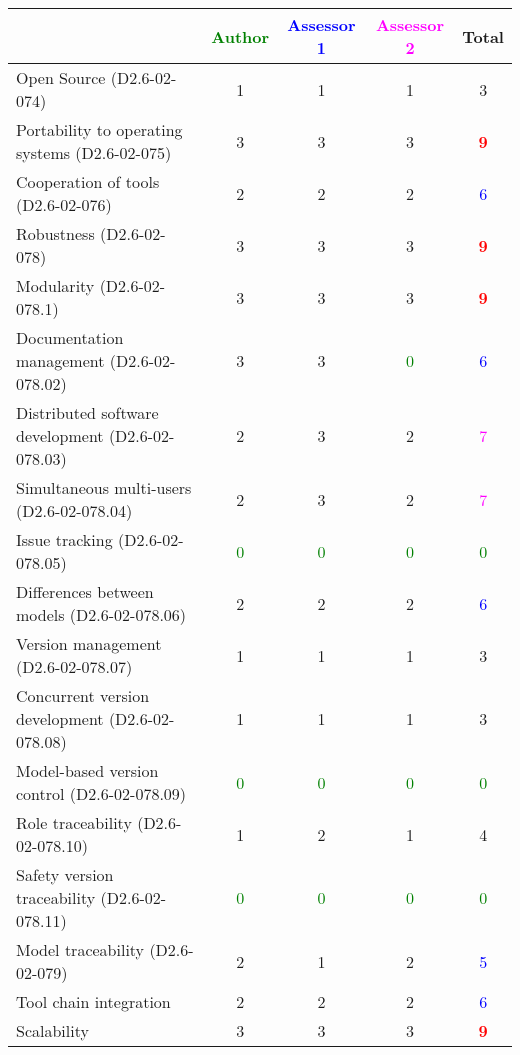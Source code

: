 \begin{tabular}{|l | c | c | c | c|}
\hline
& \textcolor{green}{Author} & \textcolor{blue}{Assessor 1} & \textcolor{magenta}{Assessor 2} & Total \\
\hline 
Open Source (D2.6-02-074) & 1    & 1    & 1    & 3    \\
\hline 
Portability to operating systems (D2.6-02-075) & 3    & 3    & 3    & \textcolor{red}{\textbf{9}} \\
\hline
Cooperation of tools (D2.6-02-076) & 2    & 2    & 2    & \textcolor{blue}{6} \\
\hline
Robustness (D2.6-02-078) & 3    & 3    & 3    & \textcolor{red}{\textbf{9}} \\
\hline
Modularity (D2.6-02-078.1) & 3    & 3    & 3    & \textcolor{red}{\textbf{9}} \\
\hline
Documentation management (D2.6-02-078.02) & 3    & 3    & \textcolor{green}{0} & \textcolor{blue}{6} \\
\hline
Distributed software development (D2.6-02-078.03)  & 2    & 3    & 2    & \textcolor{magenta}{7} \\
\hline
Simultaneous multi-users (D2.6-02-078.04)   & 2    & 3    & 2    & \textcolor{magenta}{7} \\
\hline
Issue tracking (D2.6-02-078.05) & \textcolor{green}{0} & \textcolor{green}{0} & \textcolor{green}{0} & \textcolor{green}{0} \\
\hline
Differences between models (D2.6-02-078.06) & 2    & 2    & 2    & \textcolor{blue}{6} \\
\hline
Version management (D2.6-02-078.07) & 1    & 1    & 1    & 3    \\
\hline
Concurrent version development (D2.6-02-078.08) & 1    & 1    & 1    & 3    \\
\hline
Model-based version control (D2.6-02-078.09) & \textcolor{green}{0} & \textcolor{green}{0} & \textcolor{green}{0} & \textcolor{green}{0} \\
\hline
Role traceability (D2.6-02-078.10) & 1    & 2    & 1    & 4    \\
\hline
Safety version traceability (D2.6-02-078.11) & \textcolor{green}{0} & \textcolor{green}{0} & \textcolor{green}{0} & \textcolor{green}{0} \\
\hline
Model traceability (D2.6-02-079) & 2    & 1    & 2    & \textcolor{blue}{5} \\
\hline
Tool chain integration & 2    & 2    & 2    & \textcolor{blue}{6} \\
\hline
Scalability & 3    & 3    & 3   & \textcolor{red}{\textbf{9}} \\
\hline
\end{tabular}

